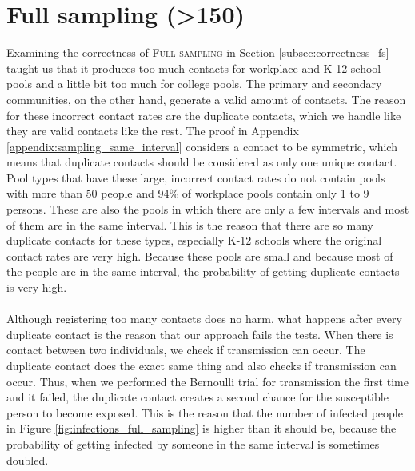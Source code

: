 \section{Full sampling (>150)}
\label{sec:adjusted_full_sampling}
Examining the correctness of \textsc{Full-sampling} in Section \ref{subsec:correctness_fs} taught us that it produces too much contacts for workplace and K-12 school pools and a little bit too much for college pools. The primary and secondary communities, on the other hand, generate a valid amount of contacts. The reason for these incorrect contact rates are the duplicate contacts, which we handle like they are valid contacts like the rest. The proof in Appendix \ref{appendix:sampling_same_interval} considers a contact to be symmetric, which means that duplicate contacts should be considered as only one unique contact. Pool types that have these large, incorrect contact rates do not contain pools with more than 50 people and 94\% of workplace pools contain only 1 to 9 persons. These are also the pools in which there are only a few intervals and most of them are in the same interval. This is the reason that there are so many duplicate contacts for these types, especially K-12 schools where the original contact rates are very high. Because these pools are small and because most of the people are in the same interval, the probability of getting duplicate contacts is very high.
\\\\
Although registering too many contacts does no harm, what happens after every duplicate contact is the reason that our approach fails the tests. When there is contact between two individuals, we check if transmission can occur. The duplicate contact does the exact same thing and also checks if transmission can occur. Thus, when we performed the Bernoulli trial for transmission the first time and it failed, the duplicate contact creates a second chance for the susceptible person to become exposed. This is the reason that the number of infected people in Figure \ref{fig:infections_full_sampling} is higher than it should be, because the probability of getting infected by someone in the same interval is sometimes doubled.
\\\\
